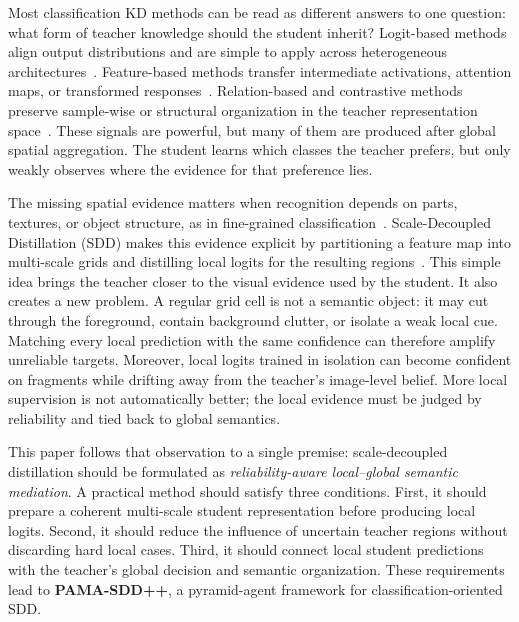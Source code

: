 \documentclass[a4paper,fleqn]{cas-dc}
\begin{document}
Most classification KD methods can be read as different answers to one
question: what form of teacher knowledge should the student inherit?
Logit-based methods align output distributions and are simple to apply across
heterogeneous architectures~\cite{hinton2015distilling,zhao2022decoupled,
yang2023knowledge}. Feature-based methods transfer intermediate activations,
attention maps, or transformed responses~\cite{romero2015fitnets,
zagoruyko2017paying,chen2021distilling,touvron2021deit}. Relation-based and
contrastive methods preserve sample-wise or structural organization in the
teacher representation space~\cite{tung2019similarity,park2019relational,
tian2020contrastive,xu2020selfsupervision}. These signals are powerful, but
many of them are produced after global spatial aggregation. The student learns
which classes the teacher prefers, but only weakly observes where the evidence
for that preference lies.

The missing spatial evidence matters when recognition depends on parts,
textures, or object structure, as in fine-grained
classification~\cite{zhuang2020apinet,du2020pmg,rao2021counterfactual,
he2022transfg}. Scale-Decoupled Distillation (SDD) makes this evidence
explicit by partitioning a feature map into multi-scale grids and distilling
local logits for the resulting regions~\cite{wei2024scaled}. This simple idea
brings the teacher closer to the visual evidence used by the student. It also
creates a new problem. A regular grid cell is not a semantic object: it may cut
through the foreground, contain background clutter, or isolate a weak local
cue. Matching every local prediction with the same confidence can therefore
amplify unreliable targets. Moreover, local logits trained in isolation can
become confident on fragments while drifting away from the teacher's
image-level belief. More local supervision is not automatically better; the
local evidence must be judged by reliability and tied back to global semantics.

This paper follows that observation to a single premise:
scale-decoupled distillation should be formulated as
\emph{reliability-aware local--global semantic mediation}. A practical method
should satisfy three conditions. First, it should prepare a coherent
multi-scale student representation before producing local logits. Second, it
should reduce the influence of uncertain teacher regions without discarding
hard local cases. Third, it should connect local student predictions with the
teacher's global decision and semantic organization. These requirements lead
to \textbf{PAMA-SDD++}, a pyramid-agent framework for classification-oriented
SDD.
\end{document}
